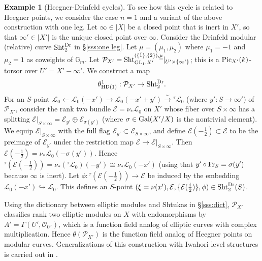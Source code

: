 \documentclass[11pt]{amsart}
\numberwithin{equation}{section}
\theoremstyle{plain}
\theoremstyle{definition}
\newtheorem{exam}[subsubsection]{Example}
\def\GG{\mathbb{G}}
\newcommand\cE{\mathcal{E}}
\newcommand\cL{\mathcal{L}}
\newcommand\cO{\mathcal{O}}
\newcommand\cP{\mathcal{P}}
\newcommand\Fr{\textup{Fr}}
\newcommand\Gal{\textup{Gal}}
\newcommand{\Pic}{\textup{Pic}}
\newcommand\Sht{\textup{Sht}}
\newcommand\GL{\textup{GL}}
\newcommand{\Gm}{\GG_m}
\newcommand{\incl}{\hookrightarrow}
\newcommand{\isom}{\stackrel{\sim}{\to}}
\newcommand\un{\underline}
\newcommand\op{\oplus}
\renewcommand\c\circ
\newcommand\G\Gamma
\renewcommand{\th}{\theta}
\newcommand{\s}{\sigma}
\renewcommand{\t}{\tau}
\newcommand{\Dr}{\mathrm{Dr}}
\newcommand\HD{\textup{HD}}
\begin{document}
\begin{exam}[Heegner-Drinfeld cycles]
To see how this cycle is related to Heegner points, we consider the case $n=1$ and a variant of the above construction with one leg. Let $\infty\in |X|$ be a closed point that is inert in $X'$, so that $\infty'\in |X'|$ is the unique closed point over $\infty$.  Consider the Drinfeld modular (relative) curve $\Sht^{\Dr}_{2}$ in \S\ref{sss:one leg}. Let $\un\mu=(\mu_{1},\mu_{2})$ where $\mu_{1}=-1$ and $\mu_{2}=1$ as coweights of $\Gm$. Let $\cP_{X'}=\Sht^{(\{1\},\{2\}), \un\mu}_{\GL_{1}, X'}|_{U'\times \{\infty'\}}$; this is a $\Pic_{X'}(k)$-torsor over $U'=X'-\infty'$. We construct a map
\begin{equation*}
\th^{1}_{\HD(1)}: \cP_{X'}\to \Sht^{\Dr}_{2}.
\end{equation*}
For an $S$-point $\cL_{0}\leftarrow\cL_{0}(-x')\rightarrow\cL_{0}(-x'+y')\isom {}^{\t}\cL_{0}$ (where $y':S\to \infty'$) of $\cP_{X'}$, consider the rank two bundle $\cE=\nu_{*}\cL_{0}$ on $X'$ whose fiber over $S\times\infty$ has a splitting $\cE|_{S\times\infty}=\cE_{y'}\op \cE_{\s(y')}$ (where $\s\in \Gal(X'/X)$ is the nontrivial element). We equip $\cE|_{S\times \infty}$ with the full flag $\cE_{y'}\subset \cE_{S\times\infty}$, and define $\cE(-\frac{1}{2})\subset \cE$ to be the preimage of $\cE_{y'}$ under the restriction map $\cE\to \cE|_{S\times \infty}$. Then $\cE(-\frac{1}{2})=\nu_{*}\cL_{0}(-\s(y'))$. Hence ${}^{\t}(\cE(-\frac{1}{2}))=\nu_{*}({}^{\t}\cL_{0})(-y')\cong \nu_{*}\cL_{0}(-x')$ (using that $y'\c\Fr_{S}=\s(y')$ because $\infty$ is inert). Let $\phi: {}^{\t}(\cE(-\frac{1}{2}))\to \cE$ be induced by the embedding $\cL_{0}(-x')\incl \cL_{0}$. This defines an $S$-point $(\xi=\nu(x'), \cE, \{\cE(\frac{i}{2})\}, \phi)\in \Sht^{\Dr}_{2}(S)$. 

Using the dictionary between elliptic modules and Shtukas in \S\ref{sss:dict},  $\cP_{X'}$ classifies rank two elliptic modules on $X$ with endomorphisms by $A'=\G(U', \cO_{U'})$, which is a function field analog of elliptic curves with complex multiplication. Hence $\th(\cP_{X'})$ is the function field analog of Heegner points on modular curves. Generalizations of this construction with Iwahori level structures is carried out in \cite{YZ2}.
\end{exam}
\end{document}
